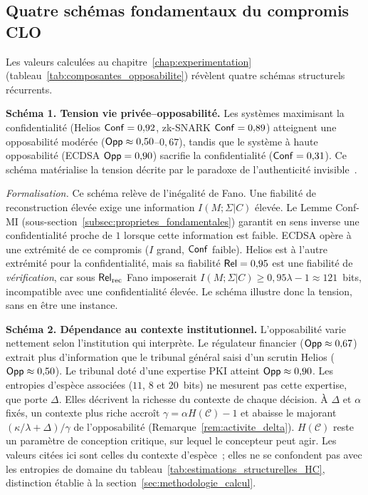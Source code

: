 \subsection{Quatre sch\'emas fondamentaux du compromis CLO}
\label{subsec:quatre_patterns}
\begin{sloppypar}

Les valeurs calcul\'ees au chapitre~\ref{chap:experimentation}
(tableau~\ref{tab:composantes_opposabilite}) r\'ev\`elent quatre sch\'emas
structurels r\'ecurrents.

\medskip
\noindent\textbf{Sch\'ema 1. Tension vie priv\'ee--opposabilit\'e.}
Les syst\`emes maximisant la confidentialit\'e (Helios $\mathsf{Conf} = 0{,}92$,
zk-SNARK $\mathsf{Conf} = 0{,}89$) atteignent une opposabilit\'e mod\'er\'ee
($\mathsf{Opp} \approx 0{,}50$--$0{,}67$), tandis que le syst\`eme \`a haute
opposabilit\'e (ECDSA $\mathsf{Opp} = 0{,}90$) sacrifie la confidentialit\'e
($\mathsf{Conf} = 0{,}31$). Ce sch\'ema mat\'erialise la tension d\'ecrite par le
paradoxe de l'authenticit\'e invisible~\cite{MINKA2026CLO}.

\noindent\textit{Formalisation.} Ce sch\'ema rel\`eve de l'in\'egalit\'e de Fano. Une
fiabilit\'e de reconstruction \'elev\'ee exige une information $I(M;\Sigma|C)$ \'elev\'ee. Le Lemme
Conf-MI (sous-section~\ref{subsec:proprietes_fondamentales}) garantit en sens inverse
une confidentialit\'e proche de $1$ lorsque cette information est faible. ECDSA op\`ere \`a une
extr\'emit\'e de ce compromis ($I$ grand, $\mathsf{Conf}$ faible). Helios est \`a
l'autre extr\'emit\'e pour la confidentialit\'e, mais sa fiabilit\'e
$\mathsf{Rel} = 0{,}95$ est une fiabilit\'e de \emph{v\'erification}, car sous $\mathsf{Rel}_{\mathrm{rec}}$ Fano
imposerait $I(M;\Sigma|C) \geq 0{,}95\lambda - 1 \approx 121$~bits, incompatible
avec une confidentialit\'e \'elev\'ee. Le sch\'ema illustre donc la tension, sans
en \^etre une instance.

\medskip
\noindent\textbf{Sch\'ema 2. D\'ependance au contexte institutionnel.}
L'opposabilit\'e varie nettement selon l'institution qui interpr\`ete. Le
r\'egulateur financier ($\mathsf{Opp} \approx 0{,}67$) extrait plus d'information que le
tribunal g\'en\'eral saisi d'un scrutin Helios ($\mathsf{Opp} \approx 0{,}50$). Le tribunal
dot\'e d'une expertise PKI atteint $\mathsf{Opp} \approx 0{,}90$. Les entropies d'esp\`ece
associ\'ees ($11$, $8$ et $20$~bits) ne mesurent pas cette expertise, que porte
$\Delta$. Elles d\'ecrivent la richesse du contexte de chaque d\'ecision. \`A $\Delta$ et $\alpha$
fix\'es, un contexte plus riche accro\^it $\gamma = \alpha H(\mathcal{C}) - 1$ et abaisse
le majorant $(\kappa/\lambda + \Delta)/\gamma$ de l'opposabilit\'e
(Remarque~\ref{rem:activite_delta}). $H(\mathcal{C})$ reste un param\`etre de
conception critique, sur lequel le concepteur peut agir. Les valeurs cit\'ees ici sont celles du contexte
d'esp\`ece~; elles ne se confondent pas avec les entropies de domaine du
tableau~\ref{tab:estimations_structurelles_HC}, distinction \'etablie
\`a la section~\ref{sec:methodologie_calcul}.


\end{sloppypar}
